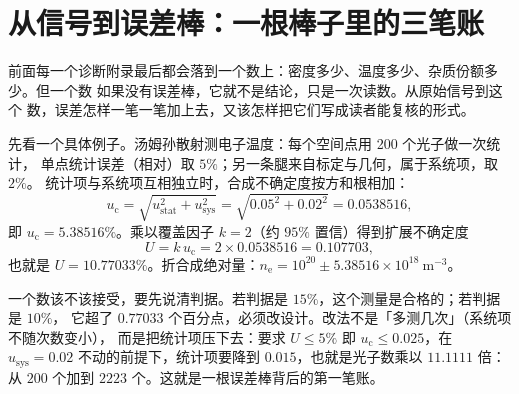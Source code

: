 \section{从信号到误差棒：一根棒子里的三笔账}
\label{sec:app-au-budget}

前面每一个诊断附录最后都会落到一个数上：密度多少、温度多少、杂质份额多少。但一个数
如果没有误差棒，它就不是结论，只是一次读数。从原始信号到这个
数，误差怎样一笔一笔加上去，又该怎样把它们写成读者能复核的形式。

先看一个具体例子。汤姆孙散射测电子温度：每个空间点用 200 个光子做一次统计，
单点统计误差（相对）取 $5\%$；另一条腿来自标定与几何，属于系统项，取 $2\%$。
统计项与系统项互相独立时，合成不确定度按方和根相加：
\begin{equation}
u_\mathrm{c}=\sqrt{u_\mathrm{stat}^2+u_\mathrm{sys}^2}
=\sqrt{0.05^2+0.02^2}=0.0538516,
\label{eq:app-au-uc}
\end{equation}
即 $u_\mathrm{c}=5.38516\%$。乘以覆盖因子 $k=2$（约 $95\%$ 置信）得到扩展不确定度
\begin{equation}
U=k\,u_\mathrm{c}=2\times0.0538516=0.107703,
\label{eq:app-au-U}
\end{equation}
也就是 $U=10.77033\%$。折合成绝对量：$n_\mathrm{e}=10^{20}\pm5.38516\times10^{18}\ \mathrm{m^{-3}}$。

一个数该不该接受，要先说清判据。若判据是 $15\%$，这个测量是合格的；若判据是 $10\%$，
它超了 $0.77033$ 个百分点，必须改设计。改法不是「多测几次」（系统项不随次数变小），
而是把统计项压下去：要求 $U\le5\%$ 即 $u_\mathrm{c}\le0.025$，在 $u_\mathrm{sys}=0.02$
不动的前提下，统计项要降到 $0.015$，也就是光子数乘以 $11.1111$ 倍：
从 $200$ 个加到 $2223$ 个。这就是一根误差棒背后的第一笔账。

